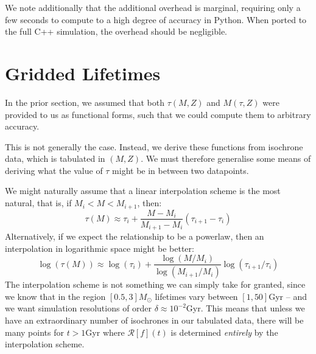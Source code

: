 \documentclass[a4paper,11pt]{article}
\begin{document}
			We note additionally that the additional overhead is marginal, requiring only a few seconds to compute to a high degree of accuracy in Python. When ported to the full C++ simulation, the overhead should be negligible. 
	\section{Gridded Lifetimes}\label{S:Interpolation}
	
		In the prior section, we assumed that both $\tau(M,Z)$ and $M(\tau,Z)$ were provided to us as functional forms, such that we could compute them to arbitrary accuracy. 

		This is not generally the case. Instead, we derive these functions from isochrone data, which is tabulated in $(M,Z)$. We must therefore generalise some means of deriving what the value of $\tau$ might be in between two datapoints. 

		We might naturally assume that a linear interpolation scheme is the most natural, that is, if $M_i < M < M_{i+1}$, then:
		\begin{equation}
			\tau(M) \approx \tau_i + \frac{M - M_i}{M_{i+1} - M_i} \left(\tau_{i+1} - \tau_i\right)
		\end{equation}
		Alternatively, if we expect the relationship to be a powerlaw, then an interpolation in logarithmic space might be better:
		\begin{equation}
			\log(\tau(M)) \approx \log(\tau_i) + \frac{\log(M/M_i)}{\log(M_{i+1}/M_i)} \log\left(\tau_{i+1}/\tau_i\right)
		\end{equation}
		The interpolation scheme is not something we can simply take for granted, since we know that in the region $[0.5,3]M_\odot$ lifetimes vary between $[1,50]$Gyr -- and we want simulation resolutions of order $\delta \approx 10^{-2}$Gyr. This means that unless we have an extraordinary number of isochrones in our tabulated data, there will be many points for $t > 1$Gyr where $\mathcal{R}[f](t)$ is determined \textit{entirely} by the interpolation scheme.
\end{document}
